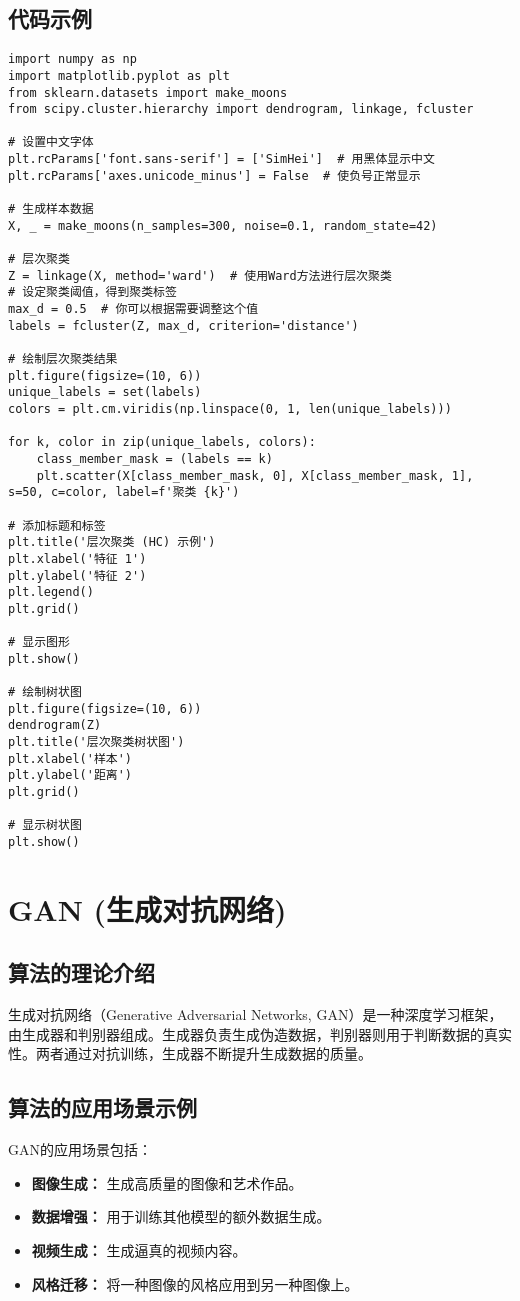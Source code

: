 \subsection*{代码示例}
\begin{lstlisting}
import numpy as np
import matplotlib.pyplot as plt
from sklearn.datasets import make_moons
from scipy.cluster.hierarchy import dendrogram, linkage, fcluster

# 设置中文字体
plt.rcParams['font.sans-serif'] = ['SimHei']  # 用黑体显示中文
plt.rcParams['axes.unicode_minus'] = False  # 使负号正常显示

# 生成样本数据
X, _ = make_moons(n_samples=300, noise=0.1, random_state=42)

# 层次聚类
Z = linkage(X, method='ward')  # 使用Ward方法进行层次聚类
# 设定聚类阈值，得到聚类标签
max_d = 0.5  # 你可以根据需要调整这个值
labels = fcluster(Z, max_d, criterion='distance')

# 绘制层次聚类结果
plt.figure(figsize=(10, 6))
unique_labels = set(labels)
colors = plt.cm.viridis(np.linspace(0, 1, len(unique_labels)))

for k, color in zip(unique_labels, colors):
    class_member_mask = (labels == k)
    plt.scatter(X[class_member_mask, 0], X[class_member_mask, 1], s=50, c=color, label=f'聚类 {k}')

# 添加标题和标签
plt.title('层次聚类 (HC) 示例')
plt.xlabel('特征 1')
plt.ylabel('特征 2')
plt.legend()
plt.grid()

# 显示图形
plt.show()

# 绘制树状图
plt.figure(figsize=(10, 6))
dendrogram(Z)
plt.title('层次聚类树状图')
plt.xlabel('样本')
plt.ylabel('距离')
plt.grid()

# 显示树状图
plt.show()

\end{lstlisting}


\section{GAN (生成对抗网络)}
\subsection*{算法的理论介绍}
生成对抗网络（Generative Adversarial Networks, GAN）是一种深度学习框架，由生成器和判别器组成。生成器负责生成伪造数据，判别器则用于判断数据的真实性。两者通过对抗训练，生成器不断提升生成数据的质量。

\subsection*{算法的应用场景示例}
GAN的应用场景包括：
\begin{itemize}
    \item \textbf{图像生成：} 生成高质量的图像和艺术作品。
    \item \textbf{数据增强：} 用于训练其他模型的额外数据生成。
    \item \textbf{视频生成：} 生成逼真的视频内容。
    \item \textbf{风格迁移：} 将一种图像的风格应用到另一种图像上。
\end{itemize}

